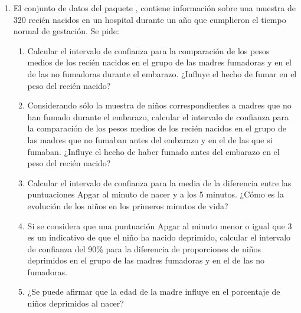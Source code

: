 \begin{enumerate}[leftmargin=*]
\item El conjunto de datos  del paquete , contiene información sobre una
muestra de 320 recién nacidos en un hospital durante un año que cumplieron el tiempo normal de gestación. 
Se pide:
\begin{enumerate}
\item Calcular el intervalo de confianza para la comparación de los pesos medios de los recién nacidos en el grupo de
las madres fumadoras y en el de las no fumadoras durante el embarazo. ¿Influye el hecho de fumar en el peso del recién
nacido?
\item Considerando sólo la muestra de niños correspondientes a madres que no han fumado durante el embarazo, calcular el
intervalo de confianza para la comparación de los pesos medios de los recién nacidos en el grupo de las madres que no
fumaban antes del embarazo y en el de las que si fumaban. ¿Influye el hecho de haber fumado antes del embarazo en el
peso del recién nacido?
\item Calcular el intervalo de confianza para la media de la diferencia entre las puntuaciones Apgar al minuto de nacer
y a los 5 minutos. ¿Cómo es la evolución de los niños en los primeros minutos de vida?
\item Si se considera que una puntuación Apgar al minuto menor o igual que 3 es un indicativo de que el niño ha
nacido deprimido, calcular el intervalo de confianza del 90\% para la diferencia de proporciones de niños deprimidos en
el grupo de las madres fumadoras y en el de las no fumadoras. 
\item ¿Se puede afirmar que la edad de la madre influye en el porcentaje de niños deprimidos al nacer?
\end{enumerate}
\end{enumerate}

